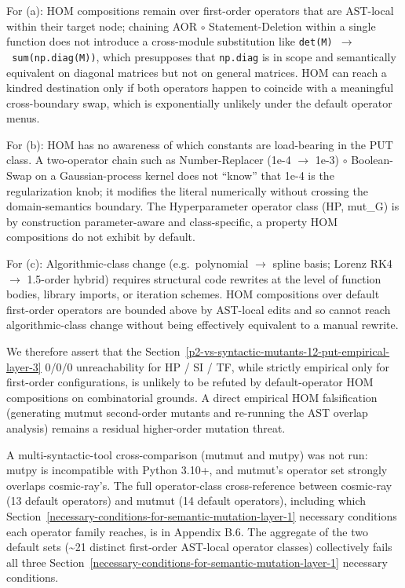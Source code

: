 \documentclass[12pt]{article}
\begin{document}
For (a): HOM compositions remain over first-order operators that are
AST-local within their target node; chaining AOR $\circ$ Statement-Deletion
within a single function does not introduce a cross-module substitution
like \texttt{det(M)\ $\to$\ sum(np.diag(M))}, which presupposes that
\texttt{np.diag} is in scope and semantically equivalent on diagonal
matrices but not on general matrices. HOM can reach a kindred
destination only if both operators happen to coincide with a meaningful
cross-boundary swap, which is exponentially unlikely under the default
operator menus.

For (b): HOM has no awareness of which constants are load-bearing in the
PUT class. A two-operator chain such as Number-Replacer (1e-4 $\to$ 1e-3) $\circ$
Boolean-Swap on a Gaussian-process kernel does not ``know'' that 1e-4 is
the regularization knob; it modifies the literal numerically without
crossing the domain-semantics boundary. The Hyperparameter operator
class (HP, mut\_G) is by construction parameter-aware and
class-specific, a property HOM compositions do not exhibit by default.

For (c): Algorithmic-class change (e.g.~polynomial $\to$ spline basis;
Lorenz RK4 $\to$ 1.5-order hybrid) requires structural code rewrites at the
level of function bodies, library imports, or iteration schemes. HOM
compositions over default first-order operators are bounded above by
AST-local edits and so cannot reach algorithmic-class change without
being effectively equivalent to a manual rewrite.

We therefore assert that the Section~\ref{p2-vs-syntactic-mutants-12-put-empirical-layer-3} 0/0/0 unreachability for HP / SI / TF,
while strictly empirical only for first-order configurations, is
unlikely to be refuted by default-operator HOM compositions on
combinatorial grounds. A direct empirical HOM falsification (generating
mutmut second-order mutants and re-running the AST overlap analysis)
remains a residual higher-order mutation threat.

A multi-syntactic-tool cross-comparison (mutmut and mutpy) was not run:
mutpy is incompatible with Python 3.10+, and mutmut's operator
set strongly overlaps cosmic-ray's. The full operator-class
cross-reference between cosmic-ray (13 default operators) and mutmut (14
default operators), including which Section~\ref{necessary-conditions-for-semantic-mutation-layer-1} necessary conditions each
operator family reaches, is in Appendix B.6. The aggregate of the two
default sets (\textasciitilde21 distinct first-order AST-local operator
classes) collectively fails all three Section~\ref{necessary-conditions-for-semantic-mutation-layer-1} necessary conditions.
\end{document}
